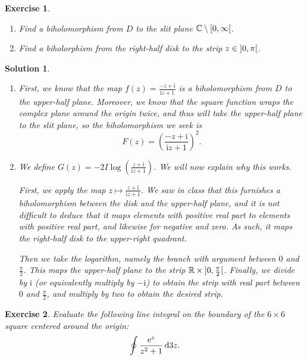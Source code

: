 \documentclass{article}
\newtheorem{ex}{Exercise}
\theoremstyle{nonumberplain}
\newtheorem{sol}{Solution}
\newcommand{\R}{\mathbb{R}}
\newcommand{\C}{\mathbb{C}}
\newcommand{\I}{\mathrm{i}}
\newcommand{\e}{\mathrm{e}}
\let\Re\relax
\DeclareMathOperator{\Re}{Re}
\begin{document}
\begin{ex}
\leavevmode
\begin{enumerate}
\item Find a biholomorphism from $D$ to the slit plane $\C \setminus \rinterval0\infty$.
\item Find a biholorphism from the right-half disk to the strip $\Re z \in \ointerval0\pi$.
\end{enumerate}
\end{ex}

\begin{sol}
\leavevmode
\begin{enumerate}
\item First, we know that the map $f(z) = \frac{-z+\I}{\I z+1}$ is a biholomorphism from $D$ to the upper-half plane. Moreover, we know that the square function wraps the complex plane around the origin twice, and thus will take the upper-half plane to the slit plane, so the biholomorphism we seek is
\begin{equation}
F(z) = \left(\frac{-z+\I}{\I z + 1}\right)^2.
\end{equation}
\item We define $G(z) = - 2 I \log\left(\frac{z+\I}{\I z + 1}\right)$. We will now explain why this works.

First, we apply the map $z \mapsto \frac{z+\I}{\I z + 1}$. We saw in class that this furnishes a biholomorphism between the disk and the upper-half plane, and it is not difficult to deduce that it maps elements with positive real part to elements with positive real part, and likewise for negative and zero. As such, it maps the right-half disk to the upper-right quadrant.

Then we take the logarithm, namely the branch with argument between $0$ and $\frac\pi2$. This maps the upper-half plane to the strip $\R \times \ointerval0{\frac\pi2}$. Finally, we divide by $\I$ (or equivalently multiply by $-\I$) to obtain the strip with real part between $0$ and $\frac\pi2$, and multiply by two to obtain the desired strip.
\end{enumerate}
\end{sol}


\begin{ex}
Evaluate the following line integral on the boundary of the $6 \times 6$ square centered around the origin:
\begin{equation}
\oint \frac{\e^z}{z^2 + 1} \dl3 z.
\end{equation}
\end{ex}
\end{document}
